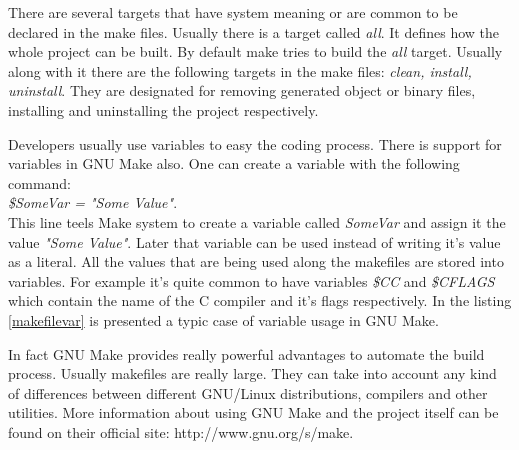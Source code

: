 There are several targets that have system meaning or are common to be declared in the make files. Usually there is a target called \textit { all}. It defines how the whole project can be built. By default make tries to build the \textit { all} target. Usually along with it there are the following targets in the make files: \textit { clean, install, uninstall}. They are designated for removing generated object or binary files, installing and uninstalling the project respectively.
	
Developers usually use variables to easy the coding process. There is support for variables in GNU Make also. One can create a variable with the following command:\\
\textit { \$SomeVar = "Some Value"}. \\
This line teels Make system to create a variable called \textit { SomeVar} and assign it the value \textit { "Some Value"}. Later that variable can be used instead of writing it's value as a literal. All the values that are being used along the makefiles are stored into variables. For example it's quite common to have variables \textit { \$CC} and \textit { \$CFLAGS} which contain the name of the C compiler and it's flags respectively.
In the listing \ref {makefilevar} is presented a typic case of variable usage in GNU Make.



In fact GNU Make provides really powerful advantages to automate the build process. Usually makefiles are really large. They can take into account any kind of differences between different GNU/Linux distributions, compilers and other utilities. More information about using GNU Make and the project itself can be found on their official site: http://www.gnu.org/s/make.

